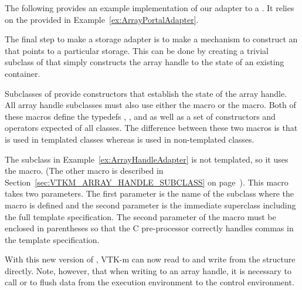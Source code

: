The following provides an example implementation of our adapter to a
. It relies on the
 provided in
Example~\ref{ex:ArrayPortalAdapter}.



The final step to make a storage adapter is to make a mechanism to
construct an  that points to a particular
storage. This can be done by creating a trivial subclass of
 that simply constructs the array handle to the state
of an existing container.


\label{sec:VTKM_ARRAY_HANDLE_SUBCLASS_NT}

Subclasses of  provide constructors that
establish the state of the array handle. All array handle subclasses must
also use either the  macro or the
 macro. Both of these macros
define the typedefs , , and
 as well as a set of constructors and operators
expected of all  classes. The difference
between these two macros is that 
is used in templated classes whereas
 is used in non-templated
classes.

The  subclass in
Example~\ref{ex:ArrayHandleAdapter} is not templated, so it uses
the  macro. (The other macro
is described in Section~\ref{sec:VTKM_ARRAY_HANDLE_SUBCLASS} on
page~\pageref{sec:VTKM_ARRAY_HANDLE_SUBCLASS}). This macro takes two
parameters. The first parameter is the name of the subclass where the macro
is defined and the second parameter is the immediate superclass including
the full template specification. The second parameter of the macro must be
enclosed in parentheses so that the C pre-processor correctly handles
commas in the template specification.

With this new version of , VTK-m can now read
to and write from the  structure directly. Note,
however, that when writing to an array handle, it is necessary to call
 or  to flush
data from the execution environment to the control environment. 

